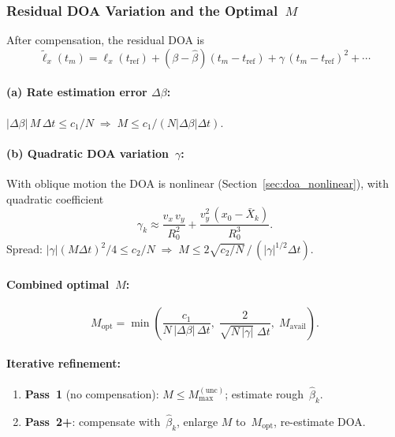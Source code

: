 \documentclass[11pt,a4paper]{article}
\begin{document}
\subsubsection{Residual DOA Variation and the Optimal~$M$}
\label{sec:optimal_M}

After compensation, the residual DOA is
\begin{equation}
  \tilde{\ell}_x(t_m) = \ell_x(t_{\mathrm{ref}})
  + (\beta{-}\hat{\beta})(t_m{-}t_{\mathrm{ref}})
  + \gamma\,(t_m{-}t_{\mathrm{ref}})^2 + \cdots
  \label{eq:residual_doa}
\end{equation}

\paragraph{(a) Rate estimation error $\Delta\beta$:}
$|\Delta\beta|\,M\,\Delta t \le c_1/N
\;\Longrightarrow\;
M \le c_1/(N|\Delta\beta|\Delta t)$.

\paragraph{(b) Quadratic DOA variation~$\gamma$:}
With oblique motion the DOA is nonlinear
(Section~\ref{sec:doa_nonlinear}), with quadratic coefficient
\begin{equation}
  \gamma_k \approx \frac{v_x\,v_y}{R_0^2}
  + \frac{v_y^2\,(x_0{-}\bar{X}_k)}{R_0^3}.
  \label{eq:gamma_approx}
\end{equation}
Spread: $|\gamma|(M\Delta t)^2/4 \le c_2/N
\;\Longrightarrow\;
M \le 2\sqrt{c_2/N}\,/\,(|\gamma|^{1/2}\Delta t)$.

\paragraph{Combined optimal~$M$:}
\begin{equation}
  \boxed{
  M_{\mathrm{opt}} = \min\!\left(
    \frac{c_1}{N\,|\Delta\beta|\,\Delta t},\;
    \frac{2}{\sqrt{N\,|\gamma|}\;\!\Delta t},\;
    M_{\mathrm{avail}}\right).}
  \label{eq:M_opt}
\end{equation}

\paragraph{Iterative refinement:}
\begin{enumerate}
  \item \textbf{Pass~1} (no compensation): $M\le M_{\max}^{(\mathrm{unc})}$;
    estimate rough~$\hat{\beta}_k$.
  \item \textbf{Pass~2+}: compensate with~$\hat{\beta}_k$, enlarge $M$
    to~$M_{\mathrm{opt}}$, re-estimate DOA.
\end{enumerate}
\end{document}

